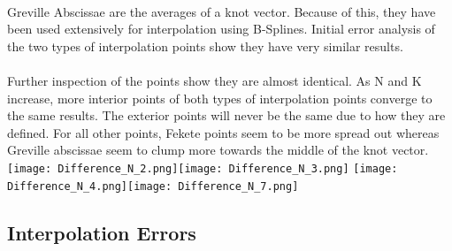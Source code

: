 \documentclass{article}
\begin{document}
\paragraph{}
Greville Abscissae are the averages of a knot vector. Because of this, they have been used extensively for interpolation using B-Splines. Initial error analysis of the two types of interpolation points show they have very similar results.
\paragraph{}
Further inspection of the points show they are almost identical. As N and K increase, more interior points of both types of interpolation points converge to the same results. The exterior points will never be the same due to how they are defined. For all other points, Fekete points seem to be more spread out whereas Greville abscissae seem to clump more towards the middle of the knot vector.
\hspace*{-2cm}\texttt{[image: Difference\_N\_2.png]}\texttt{[image: Difference\_N\_3.png]}
\hspace*{-2cm}\texttt{[image: Difference\_N\_4.png]}\texttt{[image: Difference\_N\_7.png]}
\subsection*{Interpolation Errors}
\end{document}
